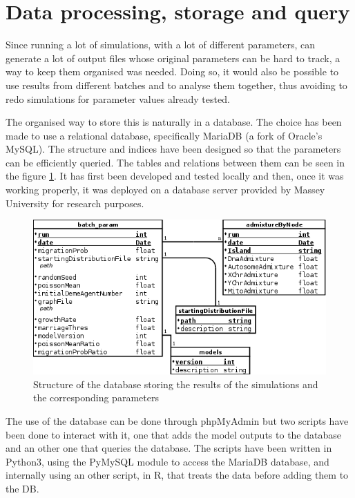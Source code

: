 \documentclass[a4paper,12pt]{report}
\begin{document}
\section{Data processing, storage and query}
Since running a lot of simulations, with a lot of different parameters, can generate a lot of output files whose original parameters can be hard to track, a way to keep them organised was needed. Doing so, it would also be possible to use results from different batches and to analyse them together, thus avoiding to redo simulations for parameter values already tested.

The organised way to store this is naturally in a database. The choice has been made to use a relational database, specifically MariaDB (a fork of Oracle’s MySQL). The structure and indices have been designed so that the parameters can be efficiently queried. The tables and relations between them can be seen in the figure \ref{db}. It has first been developed and tested locally and then, once it was working properly, it was deployed on a database server provided by Massey University for research purposes.

\begin{figure}[!htbp]
	\hspace*{-1cm}
	\includegraphics[scale=0.55]{../data/DB.png}
	\caption{Structure of the database storing the results of the simulations and the corresponding parameters}
	\label{db}
\end{figure}

The use of the database can be done through phpMyAdmin but two scripts have been done to interact with it, one that adds the model outputs to the database and an other one that queries the database. The scripts have been written in Python3, using the PyMySQL module to access the MariaDB database, and internally using an other script, in R, that treats the data before adding them to the DB.
\end{document}
